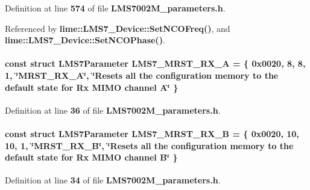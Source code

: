 Definition at line {\bf 574} of file {\bf L\+M\+S7002\+M\+\_\+parameters.\+h}.



Referenced by {\bf lime\+::\+L\+M\+S7\+\_\+\+Device\+::\+Set\+N\+C\+O\+Freq()}, and {\bf lime\+::\+L\+M\+S7\+\_\+\+Device\+::\+Set\+N\+C\+O\+Phase()}.

\paragraph[{L\+M\+S7\+\_\+\+M\+R\+S\+T\+\_\+\+R\+X\+\_\+A}]{\setlength{\rightskip}{0pt plus 5cm}const struct {\bf L\+M\+S7\+Parameter} L\+M\+S7\+\_\+\+M\+R\+S\+T\+\_\+\+R\+X\+\_\+A = \{ 0x0020, 8, 8, 1, \char`\"{}\+M\+R\+S\+T\+\_\+\+R\+X\+\_\+\+A\char`\"{}, \char`\"{}\+Resets all the configuration memory to the default state for Rx M\+I\+M\+O channel A\char`\"{} \}\hspace{0.3cm}{\ttfamily [static]}}\label{LMS7002M__parameters_8h_a7a27638d7cc8e5144468f96a58ddac79}


Definition at line {\bf 36} of file {\bf L\+M\+S7002\+M\+\_\+parameters.\+h}.

\paragraph[{L\+M\+S7\+\_\+\+M\+R\+S\+T\+\_\+\+R\+X\+\_\+B}]{\setlength{\rightskip}{0pt plus 5cm}const struct {\bf L\+M\+S7\+Parameter} L\+M\+S7\+\_\+\+M\+R\+S\+T\+\_\+\+R\+X\+\_\+B = \{ 0x0020, 10, 10, 1, \char`\"{}\+M\+R\+S\+T\+\_\+\+R\+X\+\_\+\+B\char`\"{}, \char`\"{}\+Resets all the configuration memory to the default state for Rx M\+I\+M\+O channel B\char`\"{} \}\hspace{0.3cm}{\ttfamily [static]}}\label{LMS7002M__parameters_8h_a124924201a14cfdcde833bd98d523e0a}


Definition at line {\bf 34} of file {\bf L\+M\+S7002\+M\+\_\+parameters.\+h}.

